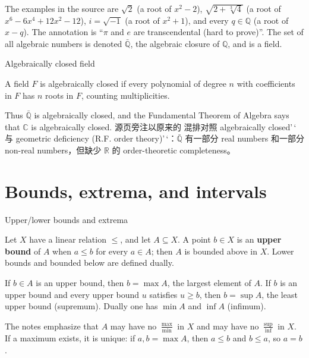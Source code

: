 The examples in the source are \(\sqrt{2}\) (a root of \(x^{2} - 2\)), \(\sqrt{2 + \sqrt[3]{4}}\) (a root of \(x^{6} - 6x^{4} + 12x^{2} - 12\)), \(i = \sqrt{- 1}\) (a root of \(x^{2} + 1\)), and every \(q \in \mathbb{Q}\) (a root of \(x - q\)). The annotation is ``\(\pi\) and \(e\) are transcendental (hard to prove)''. The set of all algebraic numbers is denoted \(\bar{\mathbb{Q}}\), the algebraic closure of \(\mathbb{Q}\), and is a field.

\begin{definition}{Algebraically closed field}

A field \(F\) is algebraically closed if every polynomial of degree \(n\) with coefficients in \(F\) has \(n\) roots in \(F\), counting multiplicities.

\end{definition}

Thus \(\bar{\mathbb{Q}}\) is algebraically closed, and the Fundamental Theorem of Algebra says that \(\mathbb{C}\) is algebraically closed. 源页旁注以原来的 混排对照 algebraically closed'\,` 与 geometric deficiency (R.F. order theory)'\,`：\(\bar{\mathbb{Q}}\) 有一部分 real numbers 和一部分 non-real numbers，但缺少 \(\mathbb{R}\) 的 order-theoretic completeness。

\section{Bounds, extrema, and intervals}

\begin{definition}{Upper/lower bounds and extrema}

Let \(X\) have a linear relation \(\leq\), and let \(A \subseteq X\). A point \(b \in X\) is an \textbf{upper bound} of \(A\) when \(a \leq b\) for every \(a \in A\); then \(A\) is bounded above in \(X\). Lower bounds and bounded below are defined dually.

If \(b \in A\) is an upper bound, then \(b = \max A\), the largest element of \(A\). If \(b\) is an upper bound and every upper bound \(u\) satisfies \(u \geq b\), then \(b = \sup A\), the least upper bound (supremum). Dually one has \(\min A\) and \(\inf A\) (infimum).

\end{definition}

The notes emphasize that \(A\) may have no \(\frac{\max}{\min}\) in \(X\) and may have no \(\frac{\sup}{\inf}\) in \(X\). If a maximum exists, it is unique: if \(a,b = \max A\), then \(a \leq b\) and \(b \leq a\), so \(a = b\).

